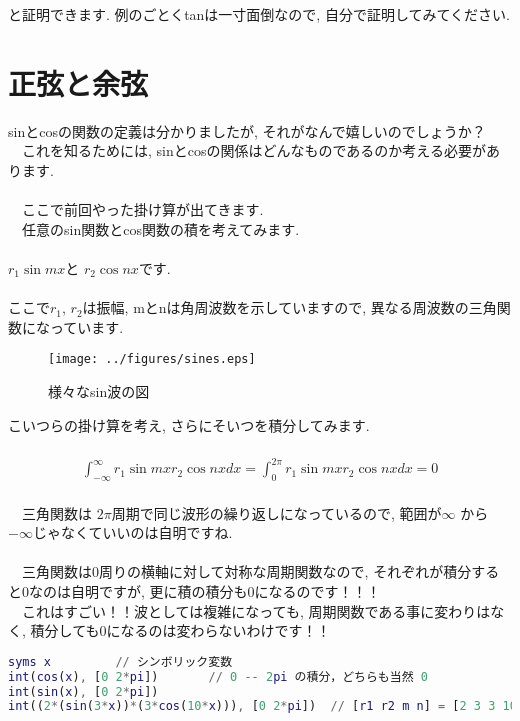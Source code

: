 \documentclass[11pt,a4paper]{ujreport}
\begin{document}
と証明できます. 例のごとくtanは一寸面倒なので, 自分で証明してみてください.
\section{正弦と余弦}
sinとcosの関数の定義は分かりましたが, それがなんで嬉しいのでしょうか？\\
　これを知るためには, sinとcosの関係はどんなものであるのか考える必要があります.\\
\\
　ここで前回やった掛け算が出てきます. \\
　任意のsin関数とcos関数の積を考えてみます.\\
\\
$r_1\sin mx $と $r_2\cos nx $です.\\
\\
ここで$r_1$, $r_2$は振幅, mとnは角周波数を示していますので, 異なる周波数の三角関数になっています.\\

\begin{figure}[H]
\label{im:sines}
  \centering
  \texttt{[image: ../figures/sines.eps]}
  \caption{様々なsin波の図}
\end{figure}

こいつらの掛け算を考え, さらにそいつを積分してみます.\\
\\
\begin{eqnarray}
\label{eq:cosint}
  \int^\infty_{-\infty} r_1\sin mx r_2\cos nx dx = \int^{2\pi}_0 r_1\sin mx r_2\cos nx dx = 0
\end{eqnarray}
\\
　三角関数は $2\pi$周期で同じ波形の繰り返しになっているので, 範囲が$\infty$ から$-\infty$じゃなくていいのは自明ですね.\\
\\
　三角関数は0周りの横軸に対して対称な周期関数なので, それぞれが積分すると0なのは自明ですが, 更に積の積分も0になるのです！！！\\
　これはすごい！！波としては複雑になっても, 周期関数である事に変わりはなく, 積分しても0になるのは変わらないわけです！！\\

\begin{lstlisting}[caption=式(\ref{eq:cosint})あたりのコード,label=sc:cosint, keepspaces=true, language=Matlab]
syms x         // シンボリック変数
int(cos(x), [0 2*pi])       // 0 -- 2pi の積分，どちらも当然 0
int(sin(x), [0 2*pi])
int((2*(sin(3*x))*(3*cos(10*x))), [0 2*pi])  // [r1 r2 m n] = [2 3 3 10] の 0--2pi の積分. これも 0
\end{lstlisting}
\end{document}
